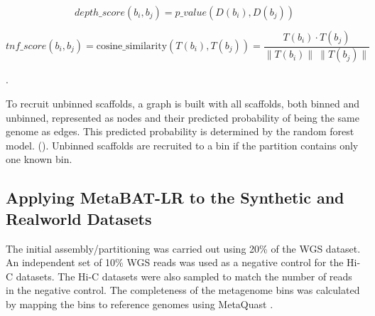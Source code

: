 \documentclass[fleqn,10pt,lineno]{wlpeerj}
\begin{document}


\\
\begin{equation}

depth\_score(b_i,b_j)=p\_value(D(b_i), D(b_j))
\end{equation}




\begin{equation}
    tnf\_score(b_i,b_j)= \text{cosine\_similarity}(T(b_i), T(b_j)) = \frac{T(b_i) \cdot T(b_j)}{\|T(b_i)\| \  \|T(b_j)\|}
\end{equation}


.

To recruit unbinned scaffolds, a graph is built with all scaffolds, both binned and unbinned, represented as nodes and their predicted probability of being the same genome as edges. This predicted probability is determined by the random forest model. (\cite{raghavan2007near}). Unbinned scaffolds are recruited to a bin if the partition contains only one known bin. 


\subsection*{Applying MetaBAT-LR to the Synthetic and Realworld Datasets}

The initial assembly/partitioning was carried out using 20\% of the WGS dataset. An independent set of 10\%  WGS reads was used as a negative control for the Hi-C datasets. The Hi-C datasets were also sampled to match the number of reads in the negative control. The completeness of the metagenome bins was calculated by mapping the bins to reference genomes using MetaQuast \citep{mikheenko2016metaquast}.
\end{document}
